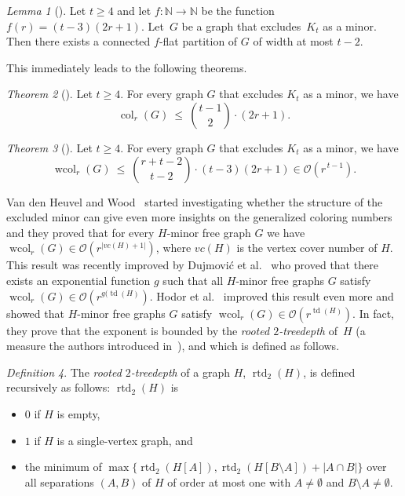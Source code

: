 \documentclass[1p,number,a4paper]{elsarticle}
\theoremstyle{remark}
\newcommand{\Oof}{\mathcal{O}}
\newcommand{\N}{\mathbb{N}}
\DeclareMathOperator{\td}{td}
\DeclareMathOperator{\rtd}{rtd}
\DeclareMathOperator{\col}{col}
\DeclareMathOperator{\wcol}{wcol}
\newtheorem{theorem}{Theorem}[section]
\newtheorem{definition}[theorem]{Definition}
\newtheorem{lemma}[theorem]{Lemma}
\begin{document}
\begin{lemma}[\cite{van2017generalised}]\label{lem:minordecompnew}
  Let $t\ge4$ and let $f:\N\to \N$ be the function $f(r)=(t-3)(2r+1)$. Let~$G$ be a graph that excludes~$K_t$ as a minor. Then there exists a
  connected $f$-flat partition of $G$ of width at most $t-2$.
\end{lemma}

This immediately leads to the following theorems. 


\begin{theorem}[\cite{van2017generalised}]\label{thm:col-Hmin}
  Let $t\ge 4$. For every graph $G$ that excludes $K_t$ as a minor, we have
  \begin{equation*}
    \col_r(G)\:\le\: \binom{t-1}{2}{}\cdot{}(2r+1).
  \end{equation*}
\end{theorem}

\begin{theorem}[\cite{van2017generalised}]\label{thm:wcol-Hmin}
  Let $t\ge 4$. For every graph $G$ that excludes $K_t$ as a minor, we have
  \begin{equation*}
    \wcol_r(G)\:\le\: \binom{r+t-2}{t-2}{}\cdot{}(t-3)(2r+1)\in
    \Oof(r^{\,t-1}).
  \end{equation*}
\end{theorem}

Van den Heuvel and Wood~\cite{van2018improper} started investigating whether the structure of the excluded minor can give even more insights on the generalized coloring numbers and they proved that for every $H$-minor free graph $G$ we have $\wcol_r(G)\in \Oof(r^{|vc(H)+1|})$, where $vc(H)$ is the vertex cover number of $H$. 
This result was recently improved by Dujmovi\'c et al.~\cite{dujmovic2024grid} who proved that there exists an exponential function $g$ such that all $H$-minor free graphs $G$ satisfy $\wcol_r(G)\in \Oof(r^{g(\td(H)})$. 
Hodor et al.~\cite{hodor2024weak} improved this result even more and showed that $H$-minor free graphs $G$ satisfy $\wcol_r(G)\in \Oof(r^{\td(H)})$. 
In fact, they prove that the exponent is bounded by the \emph{rooted $2$-treedepth} of~$H$ (a measure the authors introduced in~\cite{hodor2024weak}), and which is defined as follows. 

\begin{definition}
    The \emph{rooted $2$-treedepth} of a graph $H$, $\rtd_2(H)$, is defined recursively as follows: 
    $\rtd_2(H)$ is 
    \begin{itemize}
        \item $0$ if $H$ is empty,
        \item $1$ if $H$ is a single-vertex graph, and 
        \item the minimum of $\max\{\rtd_2(H[A]), \rtd_2(H[B\setminus A])+|A\cap B|\}$ over all separations $(A,B)$ of $H$ of order at most one with $A\neq \emptyset$ and $B\setminus A\neq \emptyset$. 
    \end{itemize}
    
\end{definition}
\end{document}
